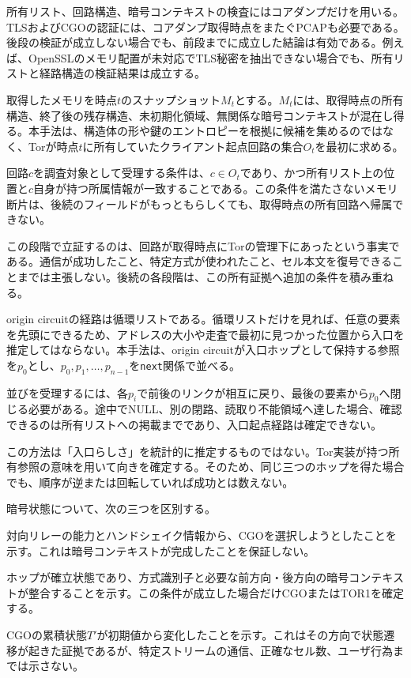\documentclass[10pt,a4paper]{ltjsarticle}
\newcommand{\code}[1]{\nolinkurl{#1}}
\newcommand{\torone}{\textsc{TOR1}}
\begin{document}
所有リスト、回路構造、暗号コンテキストの検査にはコアダンプだけを用いる。TLSおよびCGOの認証には、コアダンプ取得時点をまたぐPCAPも必要である。後段の検証が成立しない場合でも、前段までに成立した結論は有効である。例えば、OpenSSLのメモリ配置が未対応でTLS秘密を抽出できない場合でも、所有リストと経路構造の検証結果は成立する。


取得したメモリを時点$t$のスナップショット$M_t$とする。$M_t$には、取得時点の所有構造、終了後の残存構造、未初期化領域、無関係な暗号コンテキストが混在し得る。本手法は、構造体の形や鍵のエントロピーを根拠に候補を集めるのではなく、Torが時点$t$に所有していたクライアント起点回路の集合$O_t$を最初に求める。

回路$c$を調査対象として受理する条件は、$c\in O_t$であり、かつ所有リスト上の位置と$c$自身が持つ所属情報が一致することである。この条件を満たさないメモリ断片は、後続のフィールドがもっともらしくても、取得時点の所有回路へ帰属できない。

この段階で立証するのは、回路が取得時点にTorの管理下にあったという事実である。通信が成功したこと、特定方式が使われたこと、セル本文を復号できることまでは主張しない。後続の各段階は、この所有証拠へ追加の条件を積み重ねる。


origin circuitの経路は循環リストである。循環リストだけを見れば、任意の要素を先頭にできるため、アドレスの大小や走査で最初に見つかった位置から入口を推定してはならない。本手法は、origin circuitが入口ホップとして保持する参照を$p_0$とし、$p_0,p_1,\ldots,p_{n-1}$を\code{next}関係で並べる。

並びを受理するには、各$p_i$で前後のリンクが相互に戻り、最後の要素から$p_0$へ閉じる必要がある。途中でNULL、別の閉路、読取り不能領域へ達した場合、確認できるのは所有リストへの掲載までであり、入口起点経路は確定できない。

この方法は「入口らしさ」を統計的に推定するものではない。Tor実装が持つ所有参照の意味を用いて向きを確定する。そのため、同じ三つのホップを得た場合でも、順序が逆または回転していれば成功とは数えない。


暗号状態について、次の三つを区別する。

\begin{description}[style=nextline,leftmargin=2.5em]
  \item[交渉意図]
  対向リレーの能力とハンドシェイク情報から、CGOを選択しようとしたことを示す。これは暗号コンテキストが完成したことを保証しない。

  \item[確立済み暗号方式]
  ホップが確立状態であり、方式識別子と必要な前方向・後方向の暗号コンテキストが整合することを示す。この条件が成立した場合だけCGOまたは\torone{}を確定する。

  \item[CGO累積状態の更新]
  CGOの累積状態$T'$が初期値から変化したことを示す。これはその方向で状態遷移が起きた証拠であるが、特定ストリームの通信、正確なセル数、ユーザ行為までは示さない。
\end{description}
\end{document}
